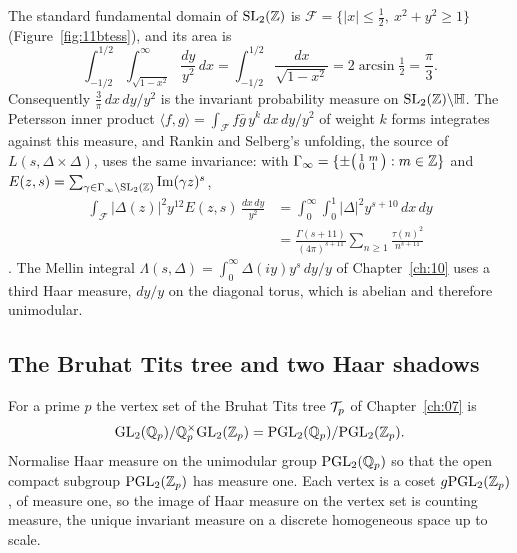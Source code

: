 The standard fundamental domain of $\mathrm{SL}_2(\mathbb{Z})$ is $\mathcal F=\{|x|\le\frac12,\ x^2+y^2\ge1\}$ (Figure~\ref{fig:11btess}), and its area is
\begin{equation}\label{eq:11barea}
\int_{-1/2}^{1/2}\int_{\sqrt{1-x^2}}^\infty\frac{dy}{y^2}\,dx=\int_{-1/2}^{1/2}\frac{dx}{\sqrt{1-x^2}}=2\arcsin\tfrac12=\frac\pi3 .
\end{equation}
Consequently $\frac3\pi\,dx\,dy/y^2$ is the invariant probability measure on $\mathrm{SL}_2(\mathbb{Z})\backslash\mathbb H$. The Petersson inner product $\langle f,g\rangle=\int_{\mathcal F}f\bar g\,y^k\,dx\,dy/y^2$ of weight $k$ forms integrates against this measure, and Rankin and Selberg's unfolding, the source of $L(s,\Delta\times\Delta)$, uses the same invariance: with $\Gamma_\infty=\{\pm\bigl(\begin{smallmatrix}1&m\\0&1\end{smallmatrix}\bigr):m\in\mathbb{Z}\}$ and $E(z,s)=\sum_{\gamma\in\Gamma_\infty\backslash\mathrm{SL}_2(\mathbb{Z})}\operatorname{Im}(\gamma z)^s$,
\[
\begin{split}\int_{\mathcal F}|\Delta(z)|^2y^{12}E(z,s)\,\frac{dx\,dy}{y^2}&=\int_0^\infty\!\!\int_0^1|\Delta|^2y^{s+10}\,dx\,dy\\&=\frac{\Gamma(s+11)}{(4\pi)^{s+11}}\sum_{n\ge1}\frac{\tau(n)^2}{n^{s+11}}\end{split}
\]
\cite{iwanieckowalski2004}. The Mellin integral $\Lambda(s,\Delta)=\int_0^\infty\Delta(iy)y^s\,dy/y$ of Chapter~\ref{ch:10} uses a third Haar measure, $dy/y$ on the diagonal torus, which is abelian and therefore unimodular.

\subsection{The Bruhat Tits tree and two Haar shadows}

For a prime $p$ the vertex set of the Bruhat Tits tree $\mathcal{T}_p$ of Chapter~\ref{ch:07} is
\[\mathrm{GL}_2(\mathbb{Q}_p)/\mathbb{Q}_p^\times\mathrm{GL}_2(\mathbb{Z}_p)=\mathrm{PGL}_2(\mathbb{Q}_p)/\mathrm{PGL}_2(\mathbb{Z}_p).\] Normalise Haar measure on the unimodular group $\mathrm{PGL}_2(\mathbb{Q}_p)$ so that the open compact subgroup $\mathrm{PGL}_2(\mathbb{Z}_p)$ has measure one. Each vertex is a coset $g\mathrm{PGL}_2(\mathbb{Z}_p)$, of measure one, so the image of Haar measure on the vertex set is counting measure, the unique invariant measure on a discrete homogeneous space up to scale.

